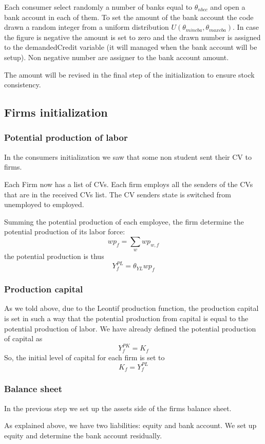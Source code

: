 \documentclass{article}
\begin{document}
\vskip5mm

Each consumer select randomly a number of banks equal to $\theta_{nbcc}$ and open a bank account in each of them. To set the amount of the bank account the code drawn a random integer from a uniform distribution $U(\theta_{mincba},\theta_{maxcba})$. In case the figure is negative the amount is set to zero and the drawn number is assigned to the demandedCredit variable (it will managed when the bank account will be setup). Non negative number are assigner to the bank account amount.

The amount will be revised in the final step of the initialization to ensure stock consistency.

\subsection{Firms initialization}
\subsubsection{Potential production of labor}
In the consumers initialization we saw that some non student sent their CV to firms.

Each Firm now has a list of CVs. Each firm employs all the senders of the CVs that are in the received CVs list. The CV senders state is switched from unemployed to employed.

Summing the potential production of each employee, the firm determine the potential production of its labor force:
\[
	wp_f=\sum_{w}wp_{w,f}
\]
the potential production is thus
\[
	Y^{PL}_f=\theta_{YL}wp_f
\]

\subsubsection{Production capital}
As we told above, due to the Leontif production function, the production capital is set in such a way that the potential production from capital is equal to the potential production of labor. We have already defined the potential production of capital as
\[Y_f^{PK}=K_f\]
So, the initial level of capital for each firm is set to
\[
K_f=Y^{PL}_f
\]
\subsubsection{Balance sheet}

In the previous step we set up the assets side of the firms balance sheet.

As explained above, we have two liabilities: equity and bank account. We set up equity and determine the bank account residually.
\end{document}
